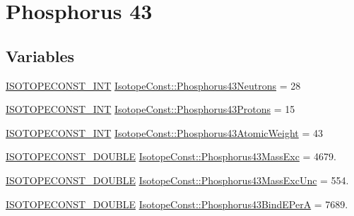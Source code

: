 \hypertarget{group___isotope_const-_phosphorus-_p43}{}\section{Phosphorus 43}
\label{group___isotope_const-_phosphorus-_p43}
\subsection*{Variables}
\begin{DoxyCompactItemize}
\item 
\mbox{\hyperlink{group___isotope_const-_macros_ga5f18360b3e99483a35c32d789e62621c}{I\+S\+O\+T\+O\+P\+E\+C\+O\+N\+S\+T\+\_\+\+I\+NT}} \mbox{\hyperlink{group___isotope_const-_phosphorus-_p43_gac6fcfcac2bde42f5a840f2ce040bd14a}{Isotope\+Const\+::\+Phosphorus43\+Neutrons}} = 28
\item 
\mbox{\hyperlink{group___isotope_const-_macros_ga5f18360b3e99483a35c32d789e62621c}{I\+S\+O\+T\+O\+P\+E\+C\+O\+N\+S\+T\+\_\+\+I\+NT}} \mbox{\hyperlink{group___isotope_const-_phosphorus-_p43_gaa66150e4685969922d7c622515d3e7bc}{Isotope\+Const\+::\+Phosphorus43\+Protons}} = 15
\item 
\mbox{\hyperlink{group___isotope_const-_macros_ga5f18360b3e99483a35c32d789e62621c}{I\+S\+O\+T\+O\+P\+E\+C\+O\+N\+S\+T\+\_\+\+I\+NT}} \mbox{\hyperlink{group___isotope_const-_phosphorus-_p43_gab01a77dc835048bef7e989b3dec96068}{Isotope\+Const\+::\+Phosphorus43\+Atomic\+Weight}} = 43
\item 
\mbox{\hyperlink{group___isotope_const-_macros_ga8f45a7272ce02c0b4c65c44636ed719a}{I\+S\+O\+T\+O\+P\+E\+C\+O\+N\+S\+T\+\_\+\+D\+O\+U\+B\+LE}} \mbox{\hyperlink{group___isotope_const-_phosphorus-_p43_gad7d8943e927ded71259681f4cb0fb027}{Isotope\+Const\+::\+Phosphorus43\+Mass\+Exc}} = 4679.
\item 
\mbox{\hyperlink{group___isotope_const-_macros_ga8f45a7272ce02c0b4c65c44636ed719a}{I\+S\+O\+T\+O\+P\+E\+C\+O\+N\+S\+T\+\_\+\+D\+O\+U\+B\+LE}} \mbox{\hyperlink{group___isotope_const-_phosphorus-_p43_ga469c02688b1a164b3dbc49ee5272a1e0}{Isotope\+Const\+::\+Phosphorus43\+Mass\+Exc\+Unc}} = 554.
\item 
\mbox{\hyperlink{group___isotope_const-_macros_ga8f45a7272ce02c0b4c65c44636ed719a}{I\+S\+O\+T\+O\+P\+E\+C\+O\+N\+S\+T\+\_\+\+D\+O\+U\+B\+LE}} \mbox{\hyperlink{group___isotope_const-_phosphorus-_p43_ga2da0ae5511a4ab09d9b931133fea6e81}{Isotope\+Const\+::\+Phosphorus43\+Bind\+E\+PerA}} = 7689.
\item 

\end{DoxyCompactItemize}
